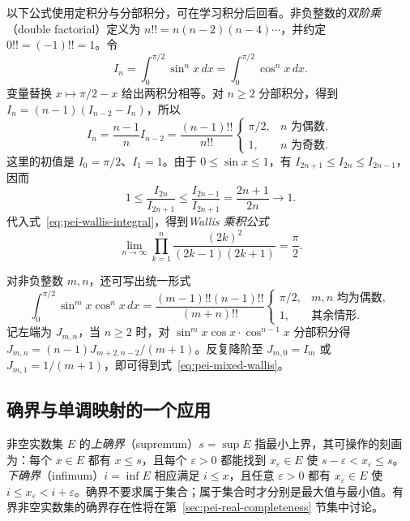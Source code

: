 以下公式使用定积分与分部积分，可在学习积分后回看。非负整数的\emph{双阶乘}（double factorial）定义为 $n!!=n(n-2)(n-4)\cdots$，并约定 $0!!=(-1)!!=1$。令
\[
    I_n=\int_0^{\pi/2}\sin^n x\,dx
       =\int_0^{\pi/2}\cos^n x\,dx.
\]
变量替换 $x\mapsto\pi/2-x$ 给出两积分相等。对 $n\ge2$ 分部积分，得到 $I_n=(n-1)(I_{n-2}-I_n)$，所以
\begin{equation}
    I_n=\frac{n-1}{n}I_{n-2}
    =\frac{(n-1)!!}{n!!}
    \begin{cases}
        \pi/2,&n\text{ 为偶数},\\
        1,&n\text{ 为奇数}.
    \end{cases}
    \label{eq:pei-wallis-integral}
\end{equation}
这里的初值是 $I_0=\pi/2$、$I_1=1$。由于 $0\le\sin x\le1$，有 $I_{2n+1}\le I_{2n}\le I_{2n-1}$，因而
\[
    1\le\frac{I_{2n}}{I_{2n+1}}
      \le\frac{I_{2n-1}}{I_{2n+1}}=\frac{2n+1}{2n}\longrightarrow1.
\]
代入式~\eqref{eq:pei-wallis-integral}，得到\emph{Wallis 乘积公式}
\begin{equation}
    \lim_{n\to\infty}
    \prod_{k=1}^n\frac{(2k)^2}{(2k-1)(2k+1)}=\frac\pi2.
    \label{eq:pei-wallis-product}
\end{equation}

对非负整数 $m,n$，还可写出统一形式
\begin{equation}
    \int_0^{\pi/2}\sin^m x\cos^n x\,dx
    =\frac{(m-1)!!(n-1)!!}{(m+n)!!}
    \begin{cases}
        \pi/2,&m,n\text{ 均为偶数},\\
        1,&\text{其余情形}.
    \end{cases}
    \label{eq:pei-mixed-wallis}
\end{equation}
记左端为 $J_{m,n}$，当 $n\ge2$ 时，对 $\sin^m x\cos x\cdot\cos^{n-1}x$ 分部积分得 $J_{m,n}=(n-1)J_{m+2,n-2}/(m+1)$。反复降阶至 $J_{m,0}=I_m$ 或 $J_{m,1}=1/(m+1)$，即可得到式~\eqref{eq:pei-mixed-wallis}。

\subsection{确界与单调映射的一个应用}

非空实数集 $E$ 的\emph{上确界}（supremum）$s=\sup E$ 指最小上界，其可操作的刻画为：每个 $x\in E$ 都有 $x\le s$，且每个 $\varepsilon>0$ 都能找到 $x_\varepsilon\in E$ 使 $s-\varepsilon<x_\varepsilon\le s$。\emph{下确界}（infimum）$i=\inf E$ 相应满足 $i\le x$，且任意 $\varepsilon>0$ 都有 $x_\varepsilon\in E$ 使 $i\le x_\varepsilon<i+\varepsilon$。确界不要求属于集合；属于集合时才分别是最大值与最小值。有界非空实数集的确界存在性将在第~\ref{sec:pei-real-completeness} 节集中讨论。

